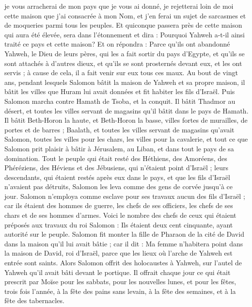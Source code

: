 \begin{multicols}{2}
je vous arracherai de mon pays que je vous ai donné, je rejetterai loin de moi cette maison que j'ai consacrée à mon Nom, et j'en ferai un sujet de sarcasmes et de moqueries parmi tous les peuples.
Et quiconque passera près de cette maison qui aura été élevée, sera dans l’étonnement et dira : Pourquoi Yahweh a-t-il ainsi traité ce pays et cette maison?
Et on répondra : Parce qu'ils ont abandonné Yahweh, le Dieu de leurs pères, qui les a fait sortir du pays d'Egypte, et qu'ils se sont attachés à d'autres dieux, et qu'ils se sont prosternés devant eux, et les ont servis ; à cause de cela, il a fait venir sur eux tous ces maux.
\VerseOne{}Au bout de vingt ans, pendant lesquels Salomon bâtit la maison de Yahweh et sa propre maison,
il bâtit les villes que Huram lui avait données et fit habiter les fils d’Israël.
Puis Salomon marcha contre Hamath de Tsoba, et la conquit.
Il bâtit Thadmor au désert, et toutes les villes servant de magasins qu'il bâtit dans le pays de Hamath.
Il bâtit Beth-Horon la haute, et Beth-Horon la basse, villes fortes de murailles, de portes et de barres ;
Baalath, et toutes les villes servant de magasins qu'avait Salomon, toutes les villes pour les chars, les villes pour la cavalerie, et tout ce que Salomon prit plaisir à bâtir à Jérusalem, au Liban, et dans tout le pays de sa domination.
Tout le peuple qui était resté des Héthiens, des Amoréens, des Phéréziens, des Héviens et des Jébusiens, qui n'étaient point d'Israël ;
leurs descendants, qui étaient restés après eux dans le pays, et que les fils d’Israël n'avaient pas détruits, Salomon les leva comme des gens de corvée jusqu'à ce jour.
Salomon n'employa comme esclave pour ses travaux aucun des fils d’Israël ; car ils étaient des hommes de guerre, les chefs de ses officiers, les chefs de ses chars et de ses hommes d'armes.
Voici le nombre des chefs de ceux qui étaient préposés aux travaux du roi Salomon : Ils étaient deux cent cinquante, ayant autorité sur le peuple.
Salomon fit monter la fille de Pharaon de la cité de David dans la maison qu'il lui avait bâtie ; car il dit : Ma femme n'habitera point dans la maison de David, roi d'Israël, parce que les lieux où l'arche de Yahweh est entrée sont saints.
Alors Salomon offrit des holocaustes à Yahweh, sur l'autel de Yahweh qu'il avait bâti devant le portique.
Il offrait chaque jour ce qui était prescrit par Moïse pour les sabbats, pour les nouvelles lunes, et pour les fêtes, trois fois l'année, à la fête des pains sans levain, à la fête des semaines, et à la fête des tabernacles.

\end{multicols}
